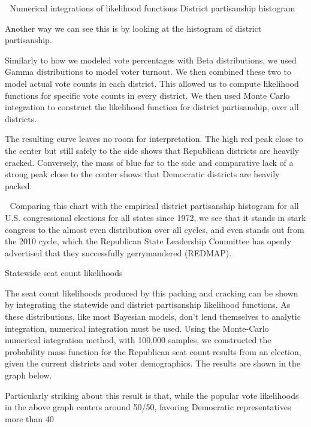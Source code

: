 \documentclass[preprint,12pt]{article}
\begin{document}

Numerical integrations of likelihood functions
District partisanship histogram
 
Another way we can see this is by looking at the histogram of district partisanship.
 
Similarly to how we modeled vote percentages with Beta distributions, we used Gamma distributions to model voter turnout.  We then combined these two to model actual vote counts in each district.  This allowed us to compute likelihood functions for specific vote counts in every district.  We then used Monte Carlo integration to construct the likelihood function for district partisanship, over all districts.
 
The resulting curve leaves no room for interpretation.  The high red peak close to the center but still safely to the side shows that Republican districts are heavily cracked.  Conversely, the mass of blue far to the side and comparative lack of a strong peak close to the center shows that Democratic districts are heavily packed.
 
 
 
 

 
 
 

Comparing this chart with the empirical district partisanship histogram for all U.S. congressional elections for all states since 1972, we see that it stands in stark congress to the almost even distribution over all cycles, and even stands out from the 2010 cycle, which the Republican State Leadership Committee has openly advertised that they successfully gerrymandered (REDMAP).

 
Statewide seat count likelihoods
 
The seat count likelihoods produced by this packing and cracking can be shown by integrating the statewide and district partisanship likelihood functions.  As these distributions, like most Bayesian models, don’t lend themselves to analytic integration, numerical integration must be used. Using the Monte-Carlo numerical integration method, with 100,000 samples, we constructed the probability mass function for the Republican seat count results from an election, given the current districts and voter demographics.  The results are shown in the graph below.
 
Particularly striking about this result is that, while the popular vote likelihoods in the above graph centers around 50/50, favoring Democratic representatives more than 40%
\end{document}
